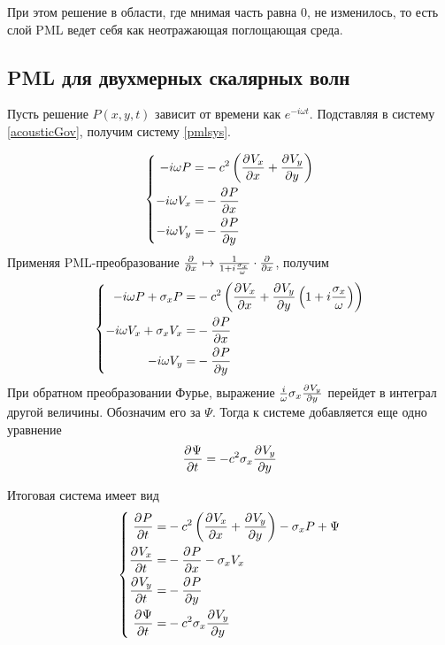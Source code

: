 \documentclass[a4paper, fontsize=14pt]{article}
\begin{document}
При этом решение в области, где мнимая часть равна 0, не изменилось, то есть слой PML ведет себя как неотражающая
поглощающая среда.
\subsection{PML для двухмерных скалярных волн  }
Пусть решение $P(x,y,t)$ зависит от времени как $e^{-i \omega t}$. Подставляя в систему
\ref{acousticGov}, получим систему \ref{pmlsys}.

\begin{equation}
	\label{pmlsys}
	\left\{
	\begin{aligned}
	    -i\omega P =& -c^2 \left( \frac{\partial ^ {  } V_x}{\partial x ^ {  } } + \frac{\partial ^ {  } V_y}{\partial y ^ {  } } \right)\\
	    -i\omega V_x	=& - \frac{\partial ^ {  } P}{\partial x ^ {  } } \\
          -i\omega V_y =& - \frac{\partial ^ {  } P}{\partial y ^ {  } } 	
    \end{aligned}
	\right.
\end{equation}
Применяя PML-преобразование $\frac{\partial ^ {  } }{\partial x ^ {  } } \mapsto
\frac{1}{1+i\frac{\sigma_x}{\omega}}\cdot\frac{\partial ^ {  } }{\partial x ^ {  } }$, получим 
\begin{equation}
	\label{pmlsystransformed}
	\left\{
	\begin{aligned}
        -i\omega P+\sigma_x P =& -c^2 \left( \frac{\partial ^ {  } V_x}{\partial x ^ {  } } +
		\frac{\partial ^ {  } V_y}{\partial y ^ {  } }\left(1+i\frac{\sigma_x}{\omega}\right) \right)\\
        -i\omega V_x+\sigma_x V_x =& - \frac{\partial ^ {  } P}{\partial x ^ {  } } \\
        -i\omega V_y =&- \frac{\partial ^ {  } P}{\partial y ^ {  } } 
	\end{aligned}
	\right.
\end{equation}
При обратном преобразовании Фурье, выражение $\frac{i}{\omega}\sigma_x \frac{\partial ^ {  } V_y}{\partial y ^ {  } }$ перейдет в
интеграл другой величины. Обозначим его за $\Psi$. Тогда к системе добавляется еще одно уравнение
\begin{equation}
	\frac{\partial ^ {  } \Psi}{\partial t ^ {  } } = -c^2 \sigma_x \frac{\partial ^ {  } V_y}{\partial y ^ {  } }
\end{equation}

	Итоговая система имеет вид
\begin{equation}
	\label{pmlsysfinal}
	\left\{
	\begin{aligned}
		\frac{\partial ^ {  } P}{\partial t ^ {  } } =& -c^2 \left( \frac{\partial ^ {  } V_x}{\partial x ^ {  } } +
		\frac{\partial ^ {  } V_y}{\partial y ^ {  } } \right) -\sigma_x P+\Psi\\
		\frac{\partial ^ {  } V_x}{\partial t ^ {  } } =& - \frac{\partial ^ {  } P}{\partial x ^ {  } } -\sigma_x V_x\\
		\frac{\partial ^ {  } V_y}{\partial t ^ {  } } =& - \frac{\partial ^ {  } P}{\partial y ^ {  } } \\
		\frac{\partial ^ {  } \Psi}{\partial t ^ {  } } =& -c^2 \sigma_x \frac{\partial ^ {  } V_y}{\partial y ^ {  } }
	\end{aligned}
	\right.
\end{equation}
\end{document}
